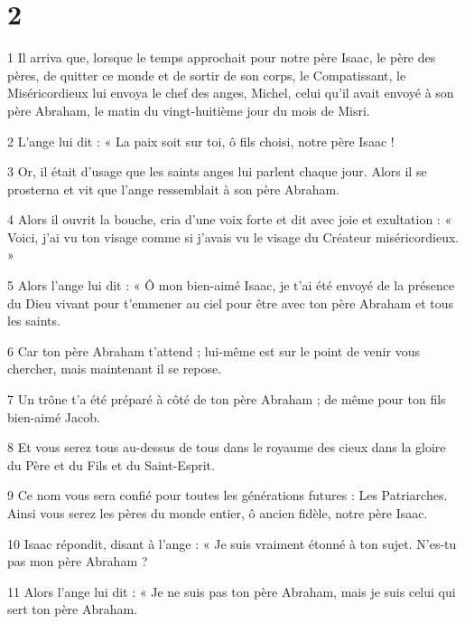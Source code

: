 \chapter{2}

\par 1 Il arriva que, lorsque le temps approchait pour notre père Isaac, le père des pères, de quitter ce monde et de sortir de son corps, le Compatissant, le Miséricordieux lui envoya le chef des anges, Michel, celui qu'il avait envoyé à son père Abraham, le matin du vingt-huitième jour du mois de Misri.

\par 2 L'ange lui dit : « La paix soit sur toi, ô fils choisi, notre père Isaac !

\par 3 Or, il était d'usage que les saints anges lui parlent chaque jour. Alors il se prosterna et vit que l'ange ressemblait à son père Abraham.

\par 4 Alors il ouvrit la bouche, cria d'une voix forte et dit avec joie et exultation : « Voici, j'ai vu ton visage comme si j'avais vu le visage du Créateur miséricordieux. »

\par 5 Alors l'ange lui dit : « Ô mon bien-aimé Isaac, je t'ai été envoyé de la présence du Dieu vivant pour t'emmener au ciel pour être avec ton père Abraham et tous les saints.

\par 6 Car ton père Abraham t'attend ; lui-même est sur le point de venir vous chercher, mais maintenant il se repose.

\par 7 Un trône t'a été préparé à côté de ton père Abraham ; de même pour ton fils bien-aimé Jacob.

\par 8 Et vous serez tous au-dessus de tous dans le royaume des cieux dans la gloire du Père et du Fils et du Saint-Esprit.

\par 9 Ce nom vous sera confié pour toutes les générations futures : Les Patriarches. Ainsi vous serez les pères du monde entier, ô ancien fidèle, notre père Isaac.

\par 10 Isaac répondit, disant à l'ange : « Je suis vraiment étonné à ton sujet. N'es-tu pas mon père Abraham ?

\par 11 Alors l'ange lui dit : « Je ne suis pas ton père Abraham, mais je suis celui qui sert ton père Abraham.

